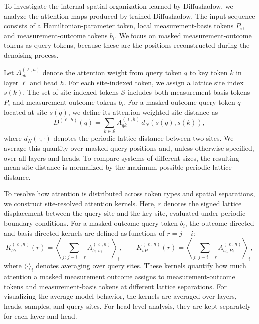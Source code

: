 \documentclass[pdflatex,sn-mathphys-num]{sn-jnl}%
\theoremstyle{thmstyleone}%
\theoremstyle{thmstyletwo}%
\theoremstyle{thmstylethree}%
\begin{document}
To investigate the internal spatial organization learned by Diffushadow, we analyze the attention maps produced by trained Diffushadow. The input sequence consists of a Hamiltonian-parameter token, local measurement-basis tokens \(P_i\), and measurement-outcome tokens \(b_i\). We focus on masked measurement-outcome tokens as query tokens, because these are the positions reconstructed during the denoising process.

Let \(A^{(\ell,h)}_{qk}\) denote the attention weight from query token \(q\) to key token \(k\) in layer \(\ell\) and head \(h\). For each site-indexed token, we assign a lattice site index \(s(k)\). The set of site-indexed tokens \(\mathcal{S}\) includes both measurement-basis tokens \(P_i\) and measurement-outcome tokens \(b_i\). For a masked outcome query token \(q\) located at site \(s(q)\), we define its attention-weighted site distance as
\begin{equation}
D^{(\ell,h)}(q)
=
\sum_{k\in\mathcal{S}}
A^{(\ell,h)}_{qk}
\,d_N\!\left(s(q),s(k)\right),
\end{equation}
where \(d_N(\cdot,\cdot)\) denotes the periodic lattice distance between two sites. We average this quantity over masked query positions and, unless otherwise specified, over all layers and heads. To compare systems of different sizes, the resulting mean site distance is normalized by the maximum possible periodic lattice distance.

To resolve how attention is distributed across token types and spatial separations, we construct site-resolved attention kernels. Here, \(r\) denotes the signed lattice displacement between the query site and the key site, evaluated under periodic boundary conditions. For a masked outcome query token \(b_i\), the outcome-directed and basis-directed kernels are defined as functions of \(r=j-i\):
\begin{equation}
K_{bb}^{(\ell,h)}(r)
=
\left\langle
\sum_{j:\,j-i=r}
A^{(\ell,h)}_{b_i,b_j}
\right\rangle_i,
\qquad
K_{bP}^{(\ell,h)}(r)
=
\left\langle
\sum_{j:\,j-i=r}
A^{(\ell,h)}_{b_i,P_j}
\right\rangle_i ,
\end{equation}
where \(\langle\cdot\rangle_i\) denotes averaging over query sites. These kernels quantify how much attention a masked measurement outcome assigns to measurement-outcome tokens and measurement-basis tokens at different lattice separations. For visualizing the average model behavior, the kernels are averaged over layers, heads, samples, and query sites. For head-level analysis, they are kept separately for each layer and head.
\end{document}
